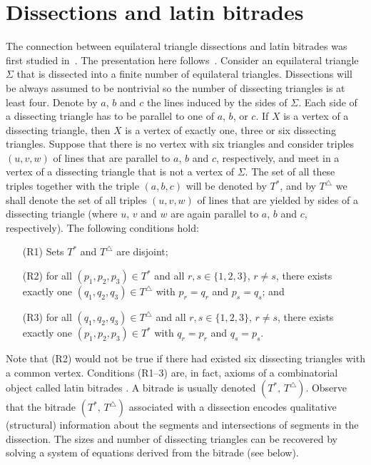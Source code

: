 \documentclass[12pt,amstags,fleqn]{article}
\theoremstyle{plain}
\theoremstyle{definition}
\theoremstyle{definition}
\def\ll{{\textstyle \ast}}
\def\rr{{\scriptscriptstyle \triangle}}
\newcommand{\opa}{\ll}
\newcommand{\opb}{\rr}
\begin{document}
\section{Dissections and latin bitrades}

The connection between equilateral triangle dissections and latin
bitrades was first studied in~\cite{aleshamming}. The presentation here
follows~\cite{alesdissections}.  
Consider an equilateral triangle $\Sigma$ that is dissected
into a finite number of equilateral triangles. 
Dissections will be always assumed to be nontrivial so the
number of dissecting triangles is at least four. 
Denote by $a$, $b$ and $c$
the lines induced by the sides of $\Sigma$.
Each side of a dissecting triangle has to be parallel
to one of $a$, $b$, or $c$. If $X$ is a vertex
of a dissecting triangle, then $X$ is a vertex of exactly one,
three or six dissecting triangles. Suppose that there is
no vertex with six triangles and consider triples 
$(u,v,w)$ of lines that are parallel to $a$, $b$ and $c$, respectively,
and meet in  a vertex of a dissecting triangle that is not a vertex
of $\Sigma$. The set of all these triples together with the triple
$(a,b,c)$ will be denoted by $T^\ll$, and by $T^\rr$ we shall
denote the set of all triples $(u,v,w)$ of lines that are yielded 
by sides of a dissecting triangle (where $u$, $v$ and $w$ are again parallel to
$a$, $b$ and $c$, respectively). The following conditions
hold:
\begin{enumerate}
\item[(R1)] Sets $T^\ll$ and $T^\rr$ are disjoint;
\item[(R2)] for all $(p_1,p_2,p_3)\in T^\ll$ and 
all $r,s \in \{1,2,3\}$, $r \ne s$, there exists exactly one
$(q_1,q_2,q_3) \in T^\rr$ with $p_r = q_r$ and $p_s = q_s$; and
\item[(R3)] for all $(q_1,q_2,q_3)\in T^\rr$ and
all $r,s \in \{1,2,3\}$, $r \ne s$, there exists exactly one
$(p_1,p_2,p_3) \in T^\ll$ with $q_r = p_r$ and $q_s = p_s$.
\end{enumerate}

Note that (R2) would not be true if there had existed six dissecting
triangles with a common vertex. Conditions (R1--3) are, in fact, axioms
of a combinatorial object called latin bitrades
\cite[p.~148]{wanlesshandbook}. A bitrade is usually denoted
$(T^{\opa},\, T^{\opb})$. Observe that the bitrade $(T^{\opa},\,
T^{\opb})$ associated with a dissection encodes
qualitative
(structural) information about the segments and intersections of
segments in the dissection. The sizes and number of dissecting triangles
can be recovered by solving a system of equations derived from 
the bitrade (see below).
\end{document}
